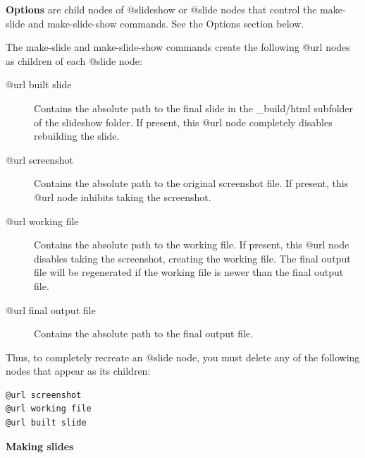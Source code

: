 \documentclass[a4paper,10pt,english]{sphinxmanual}
\begin{document}
\textbf{Options} are child nodes of @slideshow or
@slide nodes that control the make-slide and
make-slide-show commands. See the Options section
below.

The make-slide and make-slide-show commands
create the following @url nodes as children
of each @slide node:
\begin{description}
\item[{@url built slide}] \leavevmode
Contains the absolute path to the final slide in
the \_build/html subfolder of the slideshow
folder. If present, this @url node completely
disables rebuilding the slide.

\item[{@url screenshot}] \leavevmode
Contains the absolute path to the original
screenshot file. If present, this @url node
inhibits taking the screenshot.

\item[{@url working file}] \leavevmode
Contains the absolute path to the working file.
If present, this @url node disables taking the
screenshot, creating the working file. The final
output file will be regenerated if the working
file is newer than the final output file.

\item[{@url final output file}] \leavevmode
Contains the absolute path to the final output
file.

\end{description}

Thus, to completely recreate an @slide node, you
must delete any of the following nodes that appear
as its children:

\begin{Verbatim}[commandchars=\\\{\}]
@url screenshot
@url working file
@url built slide
\end{Verbatim}

\textbf{Making slides}
\end{document}
